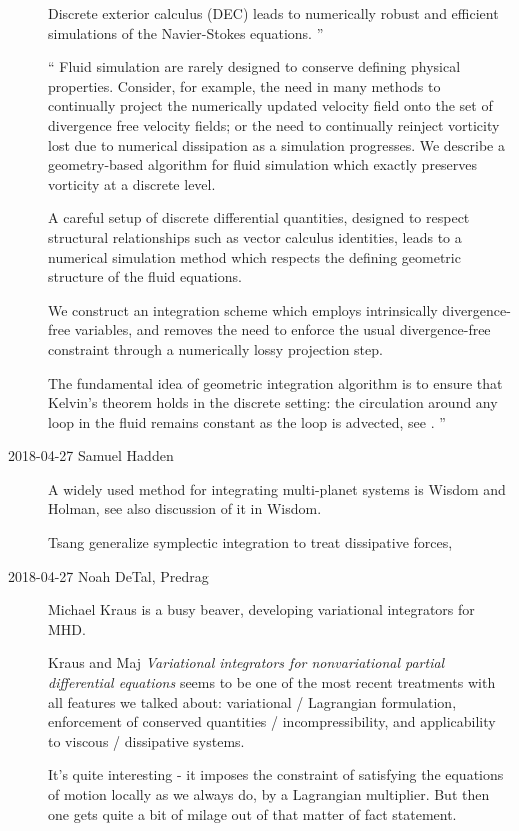 \begin{description}
Discrete exterior calculus (DEC) leads to numerically robust and efficient
simulations of the Navier-Stokes equations.
''

``
Fluid simulation are rarely designed to conserve defining physical
properties. Consider, for example, the need in many methods to continually
project the numerically updated velocity field onto the set of divergence
free velocity fields; or the need to continually reinject vorticity lost due
to numerical dissipation as a simulation progresses. We describe a
geometry-based algorithm for fluid simulation which exactly preserves
vorticity at a discrete level.

A careful setup of discrete differential quantities, designed to respect
structural relationships such as vector calculus identities, leads to a
numerical simulation method which respects the defining geometric structure
of the fluid equations.

We construct an integration scheme which employs intrinsically
divergence-free variables, and removes the need to enforce the usual
divergence-free constraint through a numerically lossy projection step.

The fundamental idea of geometric integration algorithm is to ensure that
Kelvin's theorem holds in the discrete setting: the circulation around any
loop in the fluid remains constant as the loop is advected,
see .
''

\item[2018-04-27 Samuel Hadden]
A widely used method for integrating multi-planet systems is
 Wisdom and Holman, see also discussion of it in Wisdom.

Tsang \etal{} generalize symplectic integration to treat
dissipative forces, 

\item[2018-04-27 Noah DeTal, Predrag]
{Michael Kraus} is a busy beaver, developing variational integrators
for MHD.

Kraus and Maj
{\em Variational integrators for nonvariational partial differential equations}
seems to be one of the most recent treatments with
all features we talked about: variational / Lagrangian formulation,
enforcement of conserved quantities / incompressibility, and applicability to
viscous / dissipative systems.

It's quite interesting - it imposes the constraint of satisfying the equations
of motion locally as we always do, by a Lagrangian multiplier. But then one
gets quite a bit of milage out of that matter of fact statement.


\end{description}
